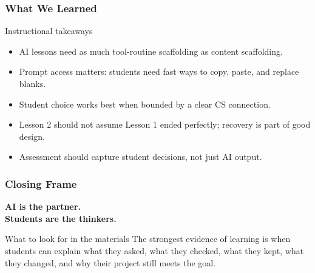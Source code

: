 \documentclass[aspectratio=169]{beamer}
\begin{document}
\begin{frame}
\frametitle{What We Learned}
\begin{block}{Instructional takeaways}
\begin{itemize}
\large
\item AI lessons need as much tool-routine scaffolding as content scaffolding.
\item Prompt access matters: students need fast ways to copy, paste, and replace blanks.
\item Student choice works best when bounded by a clear CS connection.
\item Lesson 2 should not assume Lesson 1 ended perfectly; recovery is part of good design.
\item Assessment should capture student decisions, not just AI output.
\end{itemize}
\end{block}
\end{frame}

\begin{frame}
\frametitle{Closing Frame}
\begin{center}
{\huge\bfseries AI is the partner.\\[0.15cm] Students are the thinkers.}
\end{center}
\vspace{0.35cm}
\begin{block}{What to look for in the materials}
\large The strongest evidence of learning is when students can explain what they asked, what they checked, what they kept, what they changed, and why their project still meets the goal.
\end{block}
\end{frame}
\end{document}
